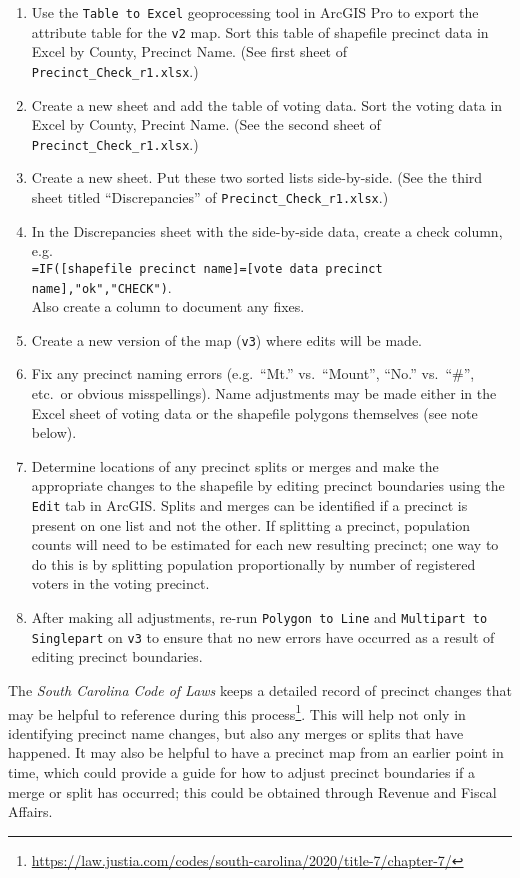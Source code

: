\documentclass[11pt]{article}
\begin{document}
\begin{enumerate}
\item Use the \verb|Table to Excel| geoprocessing tool in ArcGIS Pro to export the attribute table for the \verb|v2| map. Sort this table of shapefile precinct data in Excel by County, Precinct Name. (See first sheet of \verb|Precinct_Check_r1.xlsx|.)
\item Create a new sheet and add the table of voting data. Sort the voting data in Excel by County, Precint Name. (See the second sheet of \verb|Precinct_Check_r1.xlsx|.)
\item Create a new sheet. Put these two sorted lists side-by-side. (See the third sheet titled ``Discrepancies'' of \verb|Precinct_Check_r1.xlsx|.)
\item In the Discrepancies sheet with the side-by-side data, create a check column, e.g.\\
\verb|=IF([shapefile precinct name]=[vote data precinct name],"ok","CHECK")|.\\
Also create a column to document any fixes.

\item Create a new version of the map (\verb|v3|) where edits will be made. 

\item Fix any precinct naming errors (e.g.\ ``Mt.'' vs.\ ``Mount'', ``No.'' vs.\ ``\#'', etc.\ or obvious misspellings). Name adjustments may be made either in the Excel sheet of voting data or the shapefile polygons themselves (see note below). 

\item Determine locations of any precinct splits or merges and make the appropriate changes to the shapefile by editing precinct boundaries using the \verb|Edit| tab in ArcGIS. Splits and merges can be identified if a precinct is present on one list and not the other. If splitting a precinct, population counts will need to be estimated for each new resulting precinct; one way to do this is by splitting population proportionally by number of registered voters in the voting precinct.

\item After making all adjustments, re-run \verb|Polygon to Line| and \verb|Multipart to Singlepart| on \verb|v3| to ensure that no new errors have occurred as a result of editing precinct boundaries.
\end{enumerate}

The \textit{South Carolina Code of Laws} keeps a detailed record of precinct changes that may be helpful to reference during this process\footnote{\url{https://law.justia.com/codes/south-carolina/2020/title-7/chapter-7/}}. This will help not only in identifying precinct name changes, but also any merges or splits that have happened. It may also be helpful to have a precinct map from an earlier point in time, which could provide a guide for how to adjust precinct boundaries if a merge or split has occurred; this could be obtained through Revenue and Fiscal Affairs.\\
\end{document}
